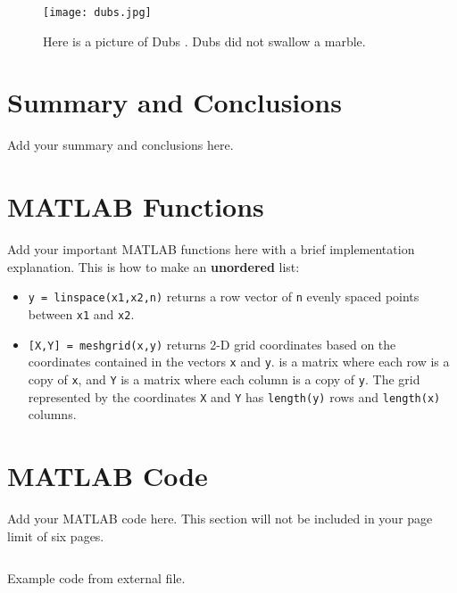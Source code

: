 \documentclass{article}
\begin{document}
\begin{figure}
    \centering
    \texttt{[image: dubs.jpg]}
    \caption{Here is a picture of Dubs \cite{webeck_2018}. Dubs did not swallow a marble.}
    \label{fig:dubs}
\end{figure}

\section{Summary and Conclusions}
Add your summary and conclusions here.

\printbibliography

\begin{appendices}

\section{MATLAB Functions}
Add your important MATLAB functions here with a brief implementation explanation. This is how to make an \textbf{unordered} list:
\begin{itemize}
    \item \texttt{y = linspace(x1,x2,n)} returns a row vector of \texttt{n} evenly spaced points between \texttt{x1} and \texttt{x2}. 
    \item \texttt{[X,Y] = meshgrid(x,y)} returns 2-D grid coordinates based on the coordinates contained in the vectors \texttt{x} and \texttt{y}.  is a matrix where each row is a copy of \texttt{x}, and \texttt{Y} is a matrix where each column is a copy of \texttt{y}. The grid represented by the coordinates \texttt{X} and \texttt{Y} has \texttt{length(y)} rows and \texttt{length(x)} columns.  
\end{itemize}

\section{MATLAB Code}
Add your MATLAB code here. This section will not be included in your page limit of six pages.

\begin{listing}[h]
\inputminted{matlab}{example.m}
\caption{Example code from external file.}
\label{listing:examplecode}
\end{listing}

\end{appendices}
\end{document}
